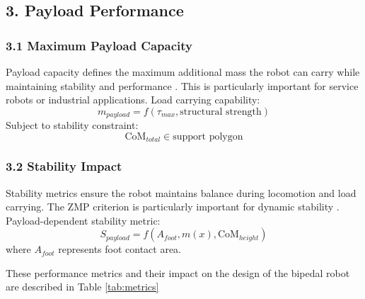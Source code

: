 \documentclass[12pt]{article}
\begin{document}
\subsection*{3. Payload Performance}
\subsubsection*{3.1 Maximum Payload Capacity}
Payload capacity defines the maximum additional mass the robot can carry while maintaining stability and performance \cite{park2021}. This is particularly important for service robots or industrial applications.
Load carrying capability:
\begin{equation}
    m_{payload} = f(\tau_{max}, \text{structural strength})
\end{equation}
Subject to stability constraint:
\begin{equation}
    \text{CoM}_{total} \in \text{support polygon}
\end{equation}

\subsubsection*{3.2 Stability Impact}
Stability metrics ensure the robot maintains balance during locomotion and load carrying. The ZMP criterion is particularly important for dynamic stability \cite{vukobratovic2004}.
Payload-dependent stability metric:
\begin{equation}
    S_{payload} = f(A_{foot}, m(x), \text{CoM}_{height})
\end{equation}
where $A_{foot}$ represents foot contact area.

\noindent\hrulefill %

\vspace{10pt} %
These performance metrics and their impact on the design of the bipedal robot are described in Table \ref{tab:metrics}
\end{document}
